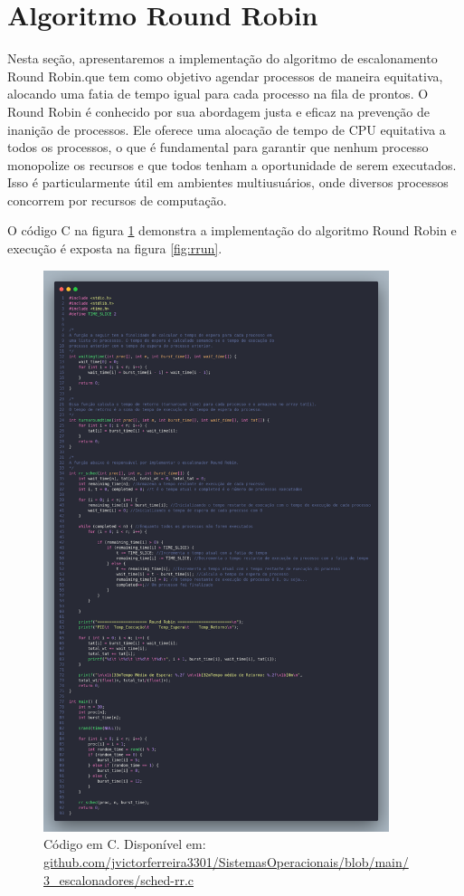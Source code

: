 \documentclass[
	12pt,				%
	openright,			%
	oneside,			%
	a4paper,			%
	chapter=TITLE,		%
	english,			%
	french,				%
	spanish,			%
	brazil				%
	]{abntex2}
\theoremstyle{definition}
\begin{document}
\section{Algoritmo Round Robin}
Nesta seção, apresentaremos a implementação do algoritmo de escalonamento Round Robin.que tem como
objetivo agendar processos de maneira equitativa, alocando uma fatia de tempo igual para cada processo 
na fila de prontos. O Round Robin é conhecido por sua abordagem justa e eficaz na prevenção de inanição 
de processos. Ele oferece uma alocação de tempo de CPU equitativa a todos os processos, o 
que é fundamental para garantir que nenhum processo monopolize os recursos e que todos tenham 
a oportunidade de serem executados. Isso é particularmente útil em ambientes multiusuários, 
onde diversos processos concorrem por recursos de computação.  

O código C na figura \ref{fig:rr} demonstra a implementação do algoritmo Round Robin e 
execução é exposta na figura \ref{fig:rrun}.

\begin{figure}[H]
    \centering
    \includegraphics[width=0.9\textwidth]{imagens/rr_src.png}
    \caption{Código em C. Disponível em: \href{https://github.com/jvictorferreira3301/Sistemas_Operacionais/blob/main/3_escalonadores/sched-rr.c}{github.com/jvictorferreira3301/SistemasOperacionais/blob/main/
    3\_escalonadores/sched-rr.c}}
    \label{fig:rr}
\end{figure}
\end{document}
